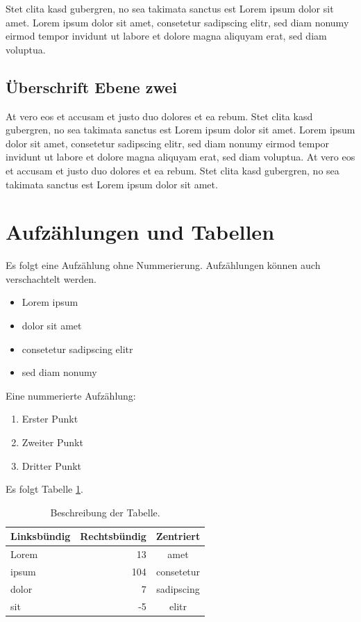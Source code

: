 \documentclass[a4paper, twoside]{IEEEtran}
\begin{document}
Stet clita kasd gubergren, no sea takimata sanctus est Lorem ipsum dolor sit amet. Lorem ipsum dolor sit amet, consetetur sadipscing elitr, sed diam nonumy eirmod tempor invidunt ut labore et dolore magna aliquyam erat, sed diam voluptua.

\subsection{Überschrift Ebene zwei}

At vero eos et accusam et justo duo dolores et ea rebum. Stet clita kasd gubergren, no sea takimata sanctus est Lorem ipsum dolor sit amet. Lorem ipsum dolor sit amet, consetetur sadipscing elitr, sed diam nonumy eirmod tempor invidunt ut labore et dolore magna aliquyam erat, sed diam voluptua. At vero eos et accusam et justo duo dolores et ea rebum. Stet clita kasd gubergren, no sea takimata sanctus est Lorem ipsum dolor sit amet.

\section{Aufzählungen und Tabellen}

Es folgt eine Aufzählung ohne Nummerierung. Aufzählungen können auch verschachtelt werden.

\begin{itemize}
\item Lorem ipsum
\item dolor sit amet
\item consetetur sadipscing elitr
\item sed diam nonumy
\end{itemize}
Eine nummerierte Aufzählung:

\begin{enumerate}
\item Erster Punkt
\item Zweiter Punkt
\item Dritter Punkt
\end{enumerate}
Es folgt Tabelle \ref{tabelle1}.

\begin{table}[htbp]
\centering
\caption{Beschreibung der Tabelle.}
\label{tabelle1}
\begin{tabular}{lrc}
\toprule
Linksbündig & Rechtsbündig & Zentriert \\
\midrule
Lorem &  13 & amet \\
ipsum & 104 & consetetur \\
dolor &   7 & sadipscing \\
sit   &  -5 & elitr \\
\bottomrule
\end{tabular}
\end{table}
\end{document}
